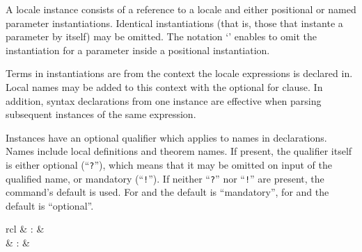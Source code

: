 \begin{isabellebody}
\begin{isamarkuptext}
  A locale instance consists of a reference to a locale and either
  positional or named parameter instantiations.  Identical
  instantiations (that is, those that instante a parameter by itself)
  may be omitted.  The notation `' enables to omit the
  instantiation for a parameter inside a positional instantiation.

  Terms in instantiations are from the context the locale expressions
  is declared in.  Local names may be added to this context with the
  optional for clause.  In addition, syntax declarations from one
  instance are effective when parsing subsequent instances of the same
  expression.

  Instances have an optional qualifier which applies to names in
  declarations.  Names include local definitions and theorem names.
  If present, the qualifier itself is either optional
  (``\texttt{?}''), which means that it may be omitted on input of the
  qualified name, or mandatory (``\texttt{!}'').  If neither
  ``\texttt{?}'' nor ``\texttt{!}'' are present, the command's default
  is used.  For \hyperlink{command.interpretation}{\mbox{}} and \hyperlink{command.interpret}{\mbox{}}
  the default is ``mandatory'', for \hyperlink{command.locale}{\mbox{}} and \hyperlink{command.sublocale}{\mbox{}} the default is ``optional''.%
\end{isamarkuptext}%
\isamarkuptrue%
%
\isamarkuptrue%
%
\begin{isamarkuptext}%
\begin{matharray}{rcl}
    \hypertarget{command.locale}{\hyperlink{command.locale}{\mbox{}}} & : &  \\
    \hypertarget{command.print-locale}{\hyperlink{command.print-locale}{\mbox{}}} & : &  \\

\end{matharray}
\end{isamarkuptext}
\end{isabellebody}
